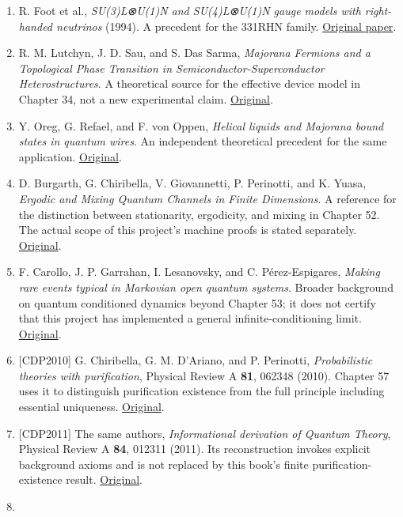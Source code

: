 \documentclass[
  11pt,
  oneside]{book}
\begin{document}
\begin{enumerate}
{  Interactions} (1992). The organization of 331 representations has
  established precedents.
  \href{https://arxiv.org/abs/hep-ph/9206242}{Original}.
\item
  R. Foot et al., \emph{SU(3)L⊗U(1)N and SU(4)L⊗U(1)N gauge models with
  right-handed neutrinos} (1994). A precedent for the 331RHN family.
  \href{https://doi.org/10.1103/PhysRevD.50.R34}{Original paper}.
\item
  R. M. Lutchyn, J. D. Sau, and S. Das Sarma, \emph{Majorana Fermions
  and a Topological Phase Transition in Semiconductor-Superconductor
  Heterostructures}. A theoretical source for the effective device model
  in Chapter 34, not a new experimental claim.
  \href{https://arxiv.org/abs/1002.4033}{Original}.
\item
  Y. Oreg, G. Refael, and F. von Oppen, \emph{Helical liquids and
  Majorana bound states in quantum wires}. An independent theoretical
  precedent for the same application.
  \href{https://arxiv.org/abs/1003.1145}{Original}.
\item
  D. Burgarth, G. Chiribella, V. Giovannetti, P. Perinotti, and K.
  Yuasa, \emph{Ergodic and Mixing Quantum Channels in Finite
  Dimensions}. A reference for the distinction between stationarity,
  ergodicity, and mixing in Chapter 52. The actual scope of this
  project's machine proofs is stated separately.
  \href{https://arxiv.org/abs/1210.5625}{Original}.
\item
  F. Carollo, J. P. Garrahan, I. Lesanovsky, and C. Pérez-Espigares,
  \emph{Making rare events typical in Markovian open quantum systems}.
  Broader background on quantum conditioned dynamics beyond Chapter 53;
  it does not certify that this project has implemented a general
  infinite-conditioning limit.
  \href{https://arxiv.org/abs/1711.10951}{Original}.
\item
  {[}CDP2010{]} G. Chiribella, G. M. D'Ariano, and P. Perinotti,
  \emph{Probabilistic theories with purification}, Physical Review A
  \textbf{81}, 062348 (2010). Chapter 57 uses it to distinguish
  purification existence from the full principle including essential
  uniqueness. \href{https://arxiv.org/abs/0908.1583}{Original}.
\item
  {[}CDP2011{]} The same authors, \emph{Informational derivation of
  Quantum Theory}, Physical Review A \textbf{84}, 012311 (2011). Its
  reconstruction invokes explicit background axioms and is not replaced
  by this book's finite purification-existence result.
  \href{https://arxiv.org/abs/1011.6451}{Original}.
\item

\end{enumerate}
\end{document}
